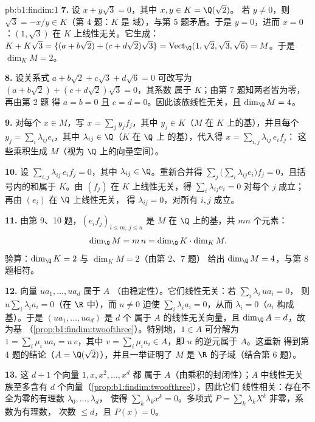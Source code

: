 \begin{solution}{pb:b1:findim:1}
\textbf{7.} 设 $x + y\sqrt3 = 0$，其中 $x, y \in K = \Q(\sqrt2)$。
若 $y \neq 0$，则 $\sqrt3 = -x/y \in K$（第 4 题：$K$ 是
域），与第 5 题矛盾。于是 $y = 0$，进而 $x = 0$：$(1,
\sqrt3)$ 在 $K$ 上线性无关。它生成：$K + K\sqrt3 =
\{(a + b\sqrt2) + (c + d\sqrt2)\sqrt3\} = \operatorname{Vect}_\Q
(1, \sqrt2, \sqrt3, \sqrt6) = M$。于是 $\dim_K M = 2$。

\textbf{8.} 设关系式 $a + b\sqrt2 + c\sqrt3 + d\sqrt6 = 0$
可改写为 $(a + b\sqrt2) + (c + d\sqrt2)\sqrt3 = 0$，其系数
属于 $K$；由第 7 题知两者皆为零，再由第 2 题
得 $a = b = 0$ 且 $c = d = 0$。因此该族线性无关，且 $\dim_\Q M
= 4$。

\textbf{9.} 对每个 $x \in M$，写 $x = \sum_j y_j f_j$，其中 $y_j
\in K$（$M$ 在 $K$ 上的基），并且每个 $y_j = \sum_i
\lambda_{ij} e_i$，其中 $\lambda_{ij} \in \Q$（$K$ 在 $\Q$ 上
的基），代入得 $x = \sum_{i,j} \lambda_{ij}\, e_i f_j$：
这些乘积生成 $M$（视为 $\Q$ 上的向量空间）。

\textbf{10.} 设 $\sum_{i,j} \lambda_{ij}\, e_i f_j = 0$，其中
$\lambda_{ij} \in \Q$。重新合并得 $\sum_j \bigl(\sum_i \lambda_{ij}
e_i\bigr) f_j = 0$，且括号内的和属于 $K$。由
$(f_j)$ 在 $K$ 上线性无关，得 $\sum_i \lambda_{ij} e_i = 0$
对每个 $j$ 成立；再由 $(e_i)$ 在 $\Q$ 上线性无关，
得 $\lambda_{ij} = 0$，对所有 $i, j$ 成立。

\textbf{11.} 由第 9、10 题，$(e_i f_j)_{i \leq m,\, j
\leq n}$ 是 $M$ 在 $\Q$ 上的基，共 $mn$ 个元素：
\[
\dim_\Q M = m\,n = \dim_\Q K \cdot \dim_K M .
\]
验算：$\dim_\Q K = 2$ 与 $\dim_K M = 2$（由第 2、7 题）
给出 $\dim_\Q M = 4$，与第 8 题相符。

\textbf{12.} 向量 $u a_1, \dots, u a_d$ 属于 $A$
（由稳定性）。它们线性无关：若 $\sum_i \lambda_i\, u a_i = 0$，
则 $u \sum_i \lambda_i a_i = 0$（在 $\R$ 中），而 $u \neq 0$ 迫使
$\sum_i \lambda_i a_i = 0$，从而 $\lambda_i = 0$（$a_i$ 构成
基）。于是 $(u a_1, \dots, u a_d)$ 是 $d$ 个
属于 $A$ 的线性无关向量，且 $\dim_\Q A = d$，故为基
（\cref{prop:b1:findim:twoofthree}）。特别地，$1 \in A$
可分解为 $1 = \sum_i \mu_i\, u a_i = u\,v$，其中 $v = \sum_i
\mu_i a_i \in A$，即 $u$ 的逆元属于 $A$。这重新
得到第 4 题的结论（$A = \Q(\sqrt2)$），并且一举证明了 $M$
是 $\R$ 的子域（结合第 6 题）。

\textbf{13.} 这 $d + 1$ 个向量 $1, x, x^2, \dots, x^{d}$ 都
属于 $A$（由乘积的封闭性）；$A$ 中线性无关族至多含有
$d$ 个向量（\cref{prop:b1:findim:twoofthree}），因此它们
线性相关：存在不全为零的有理数 $\lambda_0, \dots, \lambda_d$，
使得 $\sum_k \lambda_k x^k = 0$。多项式 $P
= \sum_k \lambda_k X^k$ 非零，系数为有理数，
次数 $\leq d$，且 $P(x) = 0$。


\end{solution}
